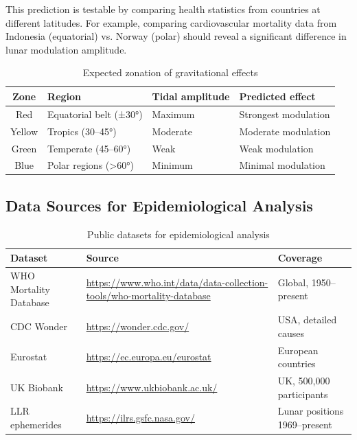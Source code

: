 \documentclass[12pt,a4paper]{article}
\theoremstyle{remark}
\begin{document}
	This prediction is testable by comparing health statistics from countries at different latitudes. For example, comparing cardiovascular mortality data from Indonesia (equatorial) vs. Norway (polar) should reveal a significant difference in lunar modulation amplitude.
	
	\begin{table}[htbp]
		\centering
		\caption{Expected zonation of gravitational effects}
		\label{tab:zonation}
		\small
		\begin{tabular}{clll}
			\toprule
			\textbf{Zone} & \textbf{Region} & \textbf{Tidal amplitude} & \textbf{Predicted effect} \\
			\midrule
			Red & Equatorial belt (±30°) & Maximum & Strongest modulation \\
			Yellow & Tropics (30–45°) & Moderate & Moderate modulation \\
			Green & Temperate (45–60°) & Weak & Weak modulation \\
			Blue & Polar regions (>60°) & Minimum & Minimal modulation \\
			\bottomrule
		\end{tabular}
	\end{table}
	
	\subsection{Data Sources for Epidemiological Analysis}
	
	\begin{table}[htbp]
		\centering
		\caption{Public datasets for epidemiological analysis}
		\label{tab:data-sources}
		\small
		\begin{tabular}{p{3.2cm}p{6.5cm}p{2.8cm}}
			\toprule
			\textbf{Dataset} & \textbf{Source} & \textbf{Coverage} \\
			\midrule
			WHO Mortality Database & 
			\url{https://www.who.int/data/data-collection-tools/who-mortality-database} & 
			Global, 1950--present \\
			CDC Wonder & 
			\url{https://wonder.cdc.gov/} & 
			USA, detailed causes \\
			Eurostat & 
			\url{https://ec.europa.eu/eurostat} & 
			European countries \\
			UK Biobank & 
			\url{https://www.ukbiobank.ac.uk/} & 
			UK, 500,000 participants \\
			LLR ephemerides & 
			\url{https://ilrs.gsfc.nasa.gov/} & 
			Lunar positions 1969--present \\
			\bottomrule
		\end{tabular}
	\end{table}
	
\end{document}
